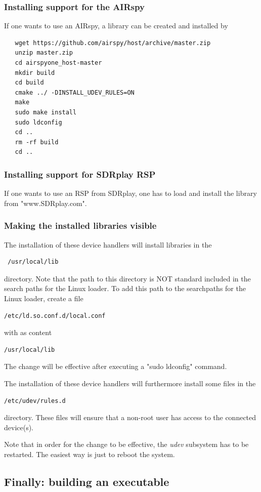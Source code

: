 \documentclass[12pt]{article}
\begin{document}
\subsubsection{Installing support for the AIRspy}
If one wants to use an AIRspy, a library can be created and installed by
{\small
\begin{verbatim}
   wget https://github.com/airspy/host/archive/master.zip
   unzip master.zip
   cd airspyone_host-master
   mkdir build
   cd build
   cmake ../ -DINSTALL_UDEV_RULES=ON
   make
   sudo make install
   sudo ldconfig
   cd ..
   rm -rf build
   cd ..
\end{verbatim}
}
\subsubsection{Installing support for SDRplay RSP}
If one wants to use an RSP from SDRplay, one has to load and install
the library from "www.SDRplay.com".

\subsubsection{Making the installed libraries visible}
The installation of these device handlers will install libraries
in the \begin{verbatim} /usr/local/lib \end{verbatim} directory. Note that the path to this
directory is NOT standard included in the search paths for the Linux loader.
To add this path to the searchpaths for the Linux loader, create a file
\begin{verbatim}
/etc/ld.so.conf.d/local.conf
\end{verbatim}
with as content
\begin{verbatim}
/usr/local/lib
\end{verbatim}
The change will be effective after executing a "sudo ldconfig" command.
\par
The installation of these device handlers will furthermore install some files
in the \begin{verbatim}/etc/udev/rules.d \end{verbatim} directory.
These files will ensure that a non-root 
user has access to the connected device(s).
\par
Note that in order for the change to be effective, the {\em udev} subsystem has
to be restarted. The easiest way is just to reboot the system.
\subsection{Finally: building an executable}
\end{document}
